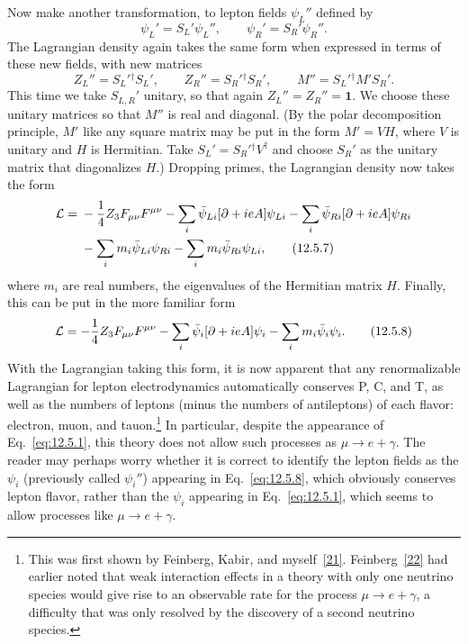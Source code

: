 Now make another transformation, to lepton fields $\psi_L''$ defined by
\begin{equation}
\psi_L'=S_L'\psi_L'',
\qquad
\psi_R'=S_R'\psi_R''.
\tag{12.5.5}\label{eq:12.5.5}
\end{equation}
The Lagrangian density again takes the same form when expressed in terms of
these new fields, with new matrices
\begin{equation}
Z_L''=S_L'{}^\dagger S_L',
\qquad
Z_R''=S_R'{}^\dagger S_R',
\qquad
M''=S_L'{}^\dagger M'S_R'.
\tag{12.5.6}\label{eq:12.5.6}
\end{equation}
This time we take $S_{L,R}'$ unitary, so that again
$Z_L''=Z_R''=\mathbf{1}$. We choose these unitary matrices so that $M''$ is
real and diagonal. (By the polar decomposition principle, $M'$ like any
square matrix may be put in the form $M'=VH$, where $V$ is unitary and $H$ is
Hermitian. Take $S_L'=S_R'{}^\dagger V^\dagger$ and choose $S_R'$ as the
unitary matrix that diagonalizes $H$.) Dropping primes, the Lagrangian density
now takes the form
\begin{align}
\mathcal L={}&-\frac14 Z_3F_{\mu\nu}F^{\mu\nu}
-\sum_i\bar\psi_{Li}[\sl{\partial}+ie\sl A]\psi_{Li}
-\sum_i\bar\psi_{Ri}[\sl{\partial}+ie\sl A]\psi_{Ri}\notag\\
&-\sum_i m_i\bar\psi_{Li}\psi_{Ri}
-\sum_i m_i\bar\psi_{Ri}\psi_{Li},
\tag{12.5.7}\label{eq:12.5.7}
\end{align}
where $m_i$ are real numbers, the eigenvalues of the Hermitian matrix $H$.
Finally, this can be put in the more familiar form
\begin{equation}
\mathcal L=-\frac14Z_3F_{\mu\nu}F^{\mu\nu}
-\sum_i\bar\psi_i[\sl{\partial}+ie\sl A]\psi_i
-\sum_i m_i\bar\psi_i\psi_i.
\tag{12.5.8}\label{eq:12.5.8}
\end{equation}
With the Lagrangian taking this form, it is now apparent that any
renormalizable Lagrangian for lepton electrodynamics automatically conserves
P, C, and T, as well as the numbers of leptons (minus the numbers of
antileptons) of each flavor: electron, muon, and tauon.\footnote{This was first
shown by Feinberg, Kabir, and myself~\hyperref[ref:12.21]{[21]}.
Feinberg~\hyperref[ref:12.22]{[22]} had earlier noted that weak interaction
effects in a theory with only one neutrino species would give rise to an
observable rate for the process $\mu\to e+\gamma$, a difficulty that was only
resolved by the discovery of a second neutrino species.} In particular,
despite the appearance of Eq.~\eqref{eq:12.5.1}, this theory does not allow
such processes as $\mu\to e+\gamma$. The reader may perhaps worry whether it
is correct to identify the lepton fields as the $\psi_i$ (previously called
$\psi_i''$) appearing in Eq.~\eqref{eq:12.5.8}, which obviously conserves
lepton flavor, rather than the $\psi_i$ appearing in Eq.~\eqref{eq:12.5.1},
which seems to allow processes like $\mu\to e+\gamma$.

